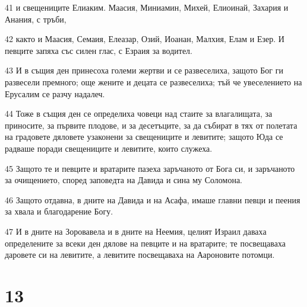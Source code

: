 \par 41 и свещениците Елиаким. Маасия, Миниамин, Михей, Елиоинай, Захария и Анания, с тръби,
\par 42 както и Маасия, Семаия, Елеазар, Озий, Иоанан, Малхия, Елам и Езер. И певците запяха със силен глас, с Езраия за водител.
\par 43 И в същия ден принесоха големи жертви и се развеселиха, защото Бог ги развесели премного; още жените и децата се развеселиха; тъй че увеселението на Ерусалим се разчу надалеч.
\par 44 Тоже в същия ден се определиха човеци над стаите за влагалищата, за приносите, за първите плодове, и за десетъците, за да събират в тях от полетата на градовете дяловете узаконени за свещениците и левитите; защото Юда се радваше поради свещениците и левитите, които служеха.
\par 45 Защото те и певците и вратарите пазеха заръчаното от Бога си, и заръчаното за очищението, според заповедта на Давида и сина му Соломона.
\par 46 Защото отдавна, в дните на Давида и на Асафа, имаше главни певци и пеения за хвала и благодарение Богу.
\par 47 И в дните на Зоровавела и в дните на Неемия, целият Израил даваха определените за всеки ден дялове на певците и на вратарите; те посвещаваха даровете си на левитите, а левитите посвещаваха на Аароновите потомци.

\chapter{13}

